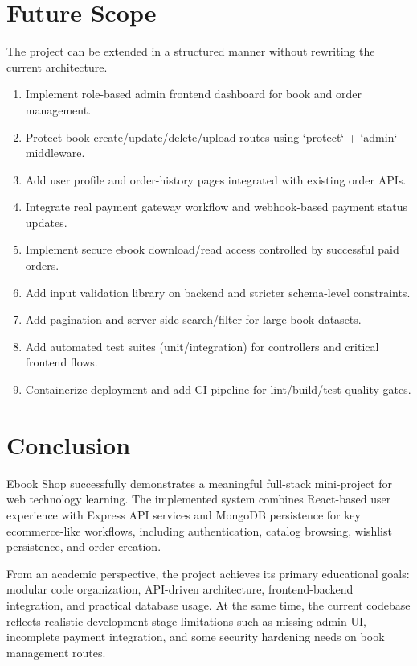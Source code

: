 \documentclass[12pt,a4paper]{report}
\begin{document}
\chapter{Future Scope}
The project can be extended in a structured manner without rewriting the current architecture.
\begin{enumerate}[label=\arabic*.]
    \item Implement role-based admin frontend dashboard for book and order management.
    \item Protect book create/update/delete/upload routes using `protect` + `admin` middleware.
    \item Add user profile and order-history pages integrated with existing order APIs.
    \item Integrate real payment gateway workflow and webhook-based payment status updates.
    \item Implement secure ebook download/read access controlled by successful paid orders.
    \item Add input validation library on backend and stricter schema-level constraints.
    \item Add pagination and server-side search/filter for large book datasets.
    \item Add automated test suites (unit/integration) for controllers and critical frontend flows.
    \item Containerize deployment and add CI pipeline for lint/build/test quality gates.
\end{enumerate}

\chapter{Conclusion}
Ebook Shop successfully demonstrates a meaningful full-stack mini-project for web technology learning. The implemented system combines React-based user experience with Express API services and MongoDB persistence for key ecommerce-like workflows, including authentication, catalog browsing, wishlist persistence, and order creation.

From an academic perspective, the project achieves its primary educational goals: modular code organization, API-driven architecture, frontend-backend integration, and practical database usage. At the same time, the current codebase reflects realistic development-stage limitations such as missing admin UI, incomplete payment integration, and some security hardening needs on book management routes.
\end{document}
